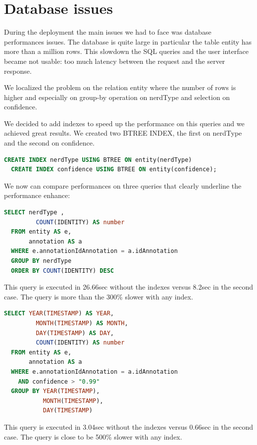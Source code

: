 \documentclass[a4paper,13pt]{report}
\begin{document}
\section{Database issues}
During the deployment the main issues we had to face was database performances issues.
The database is quite large in particular the table entity has more than a million rows. This slowdown the SQL queries and the user interface became not usable: too much latency between the request and the server response.

We localized the problem on the relation entity where the number of rows is higher and especially on group-by operation on nerdType and selection on confidence.


We decided to add indexes to speed up the performance on this queries and we achieved great results.
We created two BTREE INDEX, the first on nerdType and the second on confidence.
\vspace{0.4cm}
        \begin{lstlisting}[language=SQL]
  CREATE INDEX nerdType USING BTREE ON entity(nerdType)
  CREATE INDEX confidence USING BTREE ON entity(confidence); 
        \end{lstlisting}
\vspace{0.9cm}
We now can compare performances on three queries that clearly underline the performance enhance:
\vspace{0.3cm}
        \begin{lstlisting}[language=SQL]
  SELECT nerdType ,
         COUNT(IDENTITY) AS number
  FROM entity AS e,
       annotation AS a
  WHERE e.annotationIdAnnotation = a.idAnnotation
  GROUP BY nerdType
  ORDER BY COUNT(IDENTITY) DESC 
        \end{lstlisting}
\vspace{0.3cm}
This query is executed in 26.66sec without the indexes versus 8.2sec in the second case. The query is more than the 300\% slower with any index.

\vspace{0.9cm}
        \begin{lstlisting}[language=SQL]
   SELECT YEAR(TIMESTAMP) AS YEAR,
         MONTH(TIMESTAMP) AS MONTH,
         DAY(TIMESTAMP) AS DAY,
         COUNT(IDENTITY) AS number
  FROM entity AS e,
       annotation AS a
  WHERE e.annotationIdAnnotation = a.idAnnotation
    AND confidence > "0.99"
  GROUP BY YEAR(TIMESTAMP),
           MONTH(TIMESTAMP),
           DAY(TIMESTAMP) 
        \end{lstlisting}
\vspace{0.3cm}
This query is executed in 3.04sec without the indexes versus 0.66sec in the second case. The query is close to be 500\% slower with any index.
\end{document}
